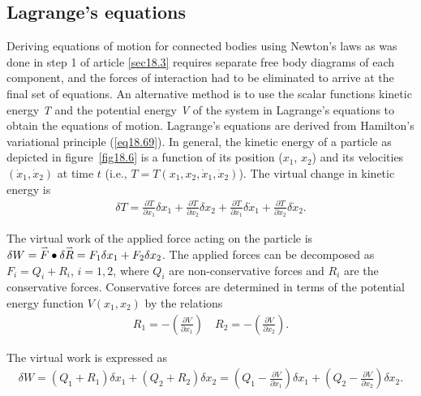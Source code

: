 \documentclass{AeroStructure-ERJohnson}
\def\harp#1{\smash{\mathord{\buildrel{\lower3pt\hbox{$\scriptscriptstyle\rightharpoonup$}}\over{#1}}}}
\begin{document}
\subsection{Lagrange's equations}\label{sec18.5.1}
Deriving equations of motion for connected bodies using Newton's laws as was done in step 1 of article \ref{sec18.3} requires separate free body diagrams of each component, and the forces of interaction had to be eliminated to arrive at the final set of equations. An alternative method is to use the scalar functions kinetic energy \textit{T} and the potential energy \textit{V} of the system in Lagrange's equations to obtain the equations of motion. Lagrange's equations are derived from Hamilton's variational principle (\ref{eq18.69}). In general, the kinetic energy of a particle as depicted in figure~\ref{fig18.6} is a function of its position ($x_1$, $x_2$) and its velocities $\left(\dot{x}_{1}, \dot{x}_{2}\right)$ at time $t$ (i.e., $T=T\left(x_{1}, x_{2}, \dot{x}_{1}, \dot{x}_{2}\right)$). The virtual change in kinetic energy is
\begin{align}\label{eq18.70}
\delta T=\frac{\partial T}{\partial x_{1}} \delta x_{1}+\frac{\partial T}{\partial x_{2}} \delta x_{2}+\frac{\partial T}{\partial \dot{x}_{1}} \delta \dot{x}_{1}+\frac{\partial T}{\partial \dot{x}_{2}} \delta \dot{x}_{2}.
\end{align}

\vspace*{-1pc}

The virtual work of the applied force acting on the particle is $\delta W=\harp{F} \bullet \delta \harp{R}=F_{1} \delta x_{1}+F_{2} \delta x_{2}$. The applied forces can be decomposed as $F_{i}=Q_{i}+R_{i}$, $i=1,2$, where $Q_{i}$ are non-conservative forces and $R_{i}$ are the conservative forces. Conservative forces are determined in terms of the potential energy function $V\left(x_{1}, x_{2}\right)$ by the relations
\begin{align}\label{eq18.71}
R_{1}=-\left(\frac{\partial V}{\partial x_{1}}\right) \quad R_{2}=-\left(\frac{\partial V}{\partial x_{2}}\right).
\end{align}

\vspace*{-1pc}\pagebreak

\noindent The virtual work is expressed as
\begin{align}\label{eq18.72}
\delta W=\left(Q_{1}+R_{1}\right) \delta x_{1}+\left(Q_{2}+R_{2}\right) \delta x_{2}=\left(Q_{1}-\frac{\partial V}{\partial x_{1}}\right) \delta x_{1}+\left(Q_{2}-\frac{\partial V}{\partial x_{2}}\right) \delta x_{2}.
\end{align}
\end{document}
